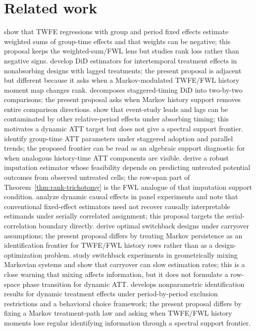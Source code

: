 \documentclass[11pt]{article}
\theoremstyle{definition}
\theoremstyle{plain}
\theoremstyle{remark}
\begin{document}
\section{Related work}
\citet{dechaisemartin2020twfe} show that TWFE regressions with group and period fixed effects estimate weighted sums of group-time effects and that weights can be negative; this proposal keeps the weighted-sum/FWL lens but studies rank loss rather than negative signs.
\citet{dechaisemartin2024intertemporal} develop DiD estimators for intertemporal treatment effects in nonabsorbing designs with lagged treatments; the present proposal is adjacent but different because it asks when a Markov-modulated TWFE/FWL history moment map changes rank.
\citet{goodmanbacon2021timing} decomposes staggered-timing DiD into two-by-two comparisons; the present proposal asks when Markov history support removes entire comparison directions.
\citet{sunabraham2021eventstudy} show that event-study leads and lags can be contaminated by other relative-period effects under absorbing timing; this motivates a dynamic ATT target but does not give a spectral support frontier.
\citet{callaway2021multiple} identify group-time ATT parameters under staggered adoption and parallel trends; the proposed frontier can be read as an algebraic support diagnostic for when analogous history-time ATT components are visible.
\citet{borusyak2024eventstudy} derive a robust imputation estimator whose feasibility depends on predicting untreated potential outcomes from observed untreated cells; the row-span part of Theorem~\ref{thm:rank-trichotomy} is the FWL analogue of that imputation support condition.
\citet{bojinov2021panel} analyze dynamic causal effects in panel experiments and note that conventional fixed-effect estimators need not recover causally interpretable estimands under serially correlated assignment; this proposal targets the serial-correlation boundary directly.
\citet{bojinov2023switchback} derive optimal switchback designs under carryover assumptions; the present proposal differs by treating Markov persistence as an identification frontier for TWFE/FWL history rows rather than as a design-optimization problem.
\citet{hu2022switchback} study switchback experiments in geometrically mixing Markovian systems and show that carryover can slow estimation rates; this is a close warning that mixing affects information, but it does not formulate a row-space phase transition for dynamic ATT.
\citet{han2021dynamic} develops nonparametric identification results for dynamic treatment effects under period-by-period exclusion restrictions and a behavioral choice framework; the present proposal differs by fixing a Markov treatment-path law and asking when TWFE/FWL history moments lose regular identifying information through a spectral support frontier.
\end{document}
